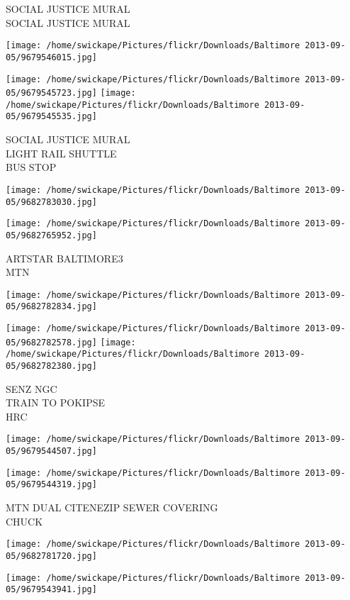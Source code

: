 \documentclass[10pt,letterpaper]{article}
\begin{document}
SOCIAL JUSTICE MURAL\\
SOCIAL JUSTICE MURAL
\pagebreak

\texttt{[image: /home/swickape/Pictures/flickr/Downloads/Baltimore 2013-09-05/9679546015.jpg]}

\vspace{0.25in}
\texttt{[image: /home/swickape/Pictures/flickr/Downloads/Baltimore 2013-09-05/9679545723.jpg]}
\texttt{[image: /home/swickape/Pictures/flickr/Downloads/Baltimore 2013-09-05/9679545535.jpg]}

SOCIAL JUSTICE MURAL\\
LIGHT RAIL SHUTTLE\\
BUS STOP
\pagebreak

\texttt{[image: /home/swickape/Pictures/flickr/Downloads/Baltimore 2013-09-05/9682783030.jpg]}

\vspace{0.25in}
\texttt{[image: /home/swickape/Pictures/flickr/Downloads/Baltimore 2013-09-05/9682765952.jpg]}

ARTSTAR BALTIMORE3\\
MTN
\pagebreak

\texttt{[image: /home/swickape/Pictures/flickr/Downloads/Baltimore 2013-09-05/9682782834.jpg]}

\vspace{0.25in}
\texttt{[image: /home/swickape/Pictures/flickr/Downloads/Baltimore 2013-09-05/9682782578.jpg]}
\texttt{[image: /home/swickape/Pictures/flickr/Downloads/Baltimore 2013-09-05/9682782380.jpg]}

SENZ NGC\\
TRAIN TO POKIPSE\\
HRC
\pagebreak

\texttt{[image: /home/swickape/Pictures/flickr/Downloads/Baltimore 2013-09-05/9679544507.jpg]}

\vspace{0.25in}
\texttt{[image: /home/swickape/Pictures/flickr/Downloads/Baltimore 2013-09-05/9679544319.jpg]}

MTN DUAL CITENEZIP SEWER COVERING\\
CHUCK
\pagebreak

\texttt{[image: /home/swickape/Pictures/flickr/Downloads/Baltimore 2013-09-05/9682781720.jpg]}

\vspace{0.25in}
\texttt{[image: /home/swickape/Pictures/flickr/Downloads/Baltimore 2013-09-05/9679543941.jpg]}
\end{document}
